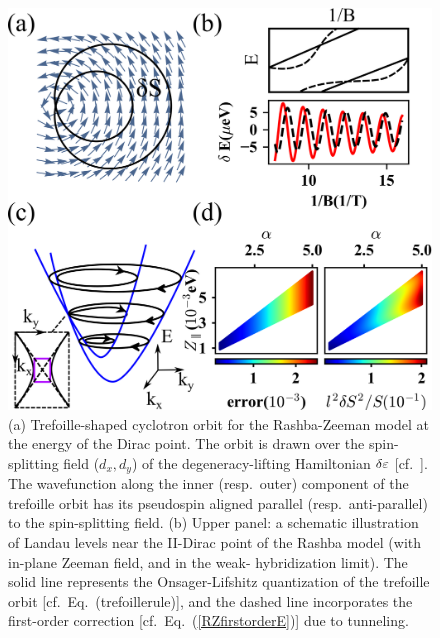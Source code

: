 \documentclass[aps, prb, showpacs, twocolumn, notitlepage, superscriptaddress]{revtex4-1}
\begin{document}
\begin{figure}
\includegraphics[width=1.0\columnwidth]{RZ.png}
\caption{(a) Trefoille-shaped cyclotron orbit for the Rashba-Zeeman model at the energy of the Dirac point. The orbit is drawn over the  spin-splitting field ($d_x,d_y$) of the degeneracy-lifting Hamiltonian $\delta\varepsilon$ [cf.\ ]. The wavefunction along the inner (resp.\ outer) component of the trefoille orbit has its pseudospin aligned parallel (resp.\ anti-parallel) to the spin-splitting field. (b) Upper panel: a schematic illustration of Landau levels near the II-Dirac point of the Rashba model (with in-plane Zeeman field, and in the weak- hybridization limit). The solid line represents the Onsager-Lifshitz quantization of the trefoille orbit [cf.\ Eq.\ ({trefoillerule})], and the dashed line incorporates the first-order correction [cf.\ Eq.\ (\ref{RZfirstorderE})] due to tunneling. 
}
\end{figure}
\end{document}
